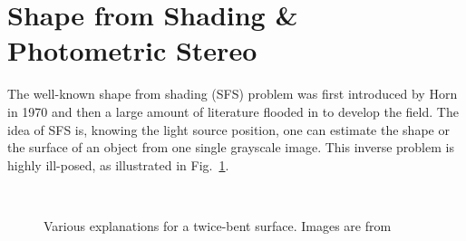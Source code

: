 \section{Shape from Shading \& Photometric Stereo}

The well-known shape from shading (SFS) problem was first introduced by Horn~\cite{horn1970shape} in 1970 and then a large amount of literature flooded in to develop the field.
The idea of SFS is, knowing the light source position, one can estimate the shape or the surface of an object from one single grayscale image.
This inverse problem is highly ill-posed, as illustrated in Fig.~\ref{fig:paint}.


\begin{figure}[!ht]
\centering
{}
\\
\caption{Various explanations for a twice-bent surface. Images are from~\cite{adelson1996perception}}
\label{fig:paint}
\end{figure}


